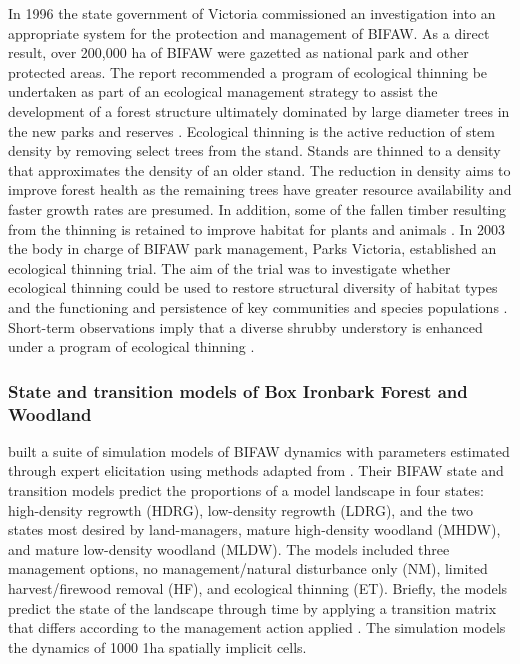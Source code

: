 \documentclass[draft]{article}
\theoremstyle{definition}
\theoremstyle{definition}
\theoremstyle{definition}
\theoremstyle{remark}
\begin{document}
In 1996 the state government of Victoria commissioned an investigation
into an appropriate system for the protection and management of BIFAW.
As a direct result, over 200,000 ha of BIFAW were gazetted as national
park and other protected areas. The report recommended a program of
ecological thinning be undertaken as part of an ecological management
strategy to assist the development of a forest structure ultimately
dominated by large diameter trees in the new parks and reserves
\citep{ECC2001, Pigott2009}. Ecological thinning is the active reduction
of stem density by removing select trees from the stand. Stands are
thinned to a density that approximates the density of an older stand.
The reduction in density aims to improve forest health as the remaining
trees have greater resource availability and faster growth rates are
presumed. In addition, some of the fallen timber resulting from the
thinning is retained to improve habitat for plants and animals
\citep{Cunningham2009, Horner2010}. In 2003 the body in charge of BIFAW
park management, Parks Victoria, established an ecological thinning
trial. The aim of the trial was to investigate whether ecological
thinning could be used to restore structural diversity of habitat types
and the functioning and persistence of key communities and species
populations \citep{Pigott2010}. Short-term observations imply that a
diverse shrubby understory is enhanced under a program of ecological
thinning \citep{Jones2015}.

\subsubsection*{State and transition models of Box Ironbark Forest and
Woodland}\label{state-and-transition-models-of-box-ironbark-forest-and-woodland}

\citet{Czembor2009} built a suite of simulation models of BIFAW dynamics
with parameters estimated through expert elicitation using methods
adapted from \citet{Morgan1990}. Their BIFAW state and transition models
predict the proportions of a model landscape in four states:
high-density regrowth (HDRG), low-density regrowth (LDRG), and the two
states most desired by land-managers, mature high-density woodland
(MHDW), and mature low-density woodland (MLDW). The models included
three management options, no management/natural disturbance only (NM),
limited harvest/firewood removal (HF), and ecological thinning (ET).
Briefly, the models predict the state of the landscape through time by
applying a transition matrix that differs according to the management
action applied \citep[see methods,][ for more
information]{Czembor2009, Czembor2011}. The simulation models the
dynamics of 1000 1ha spatially implicit cells.
\end{document}
